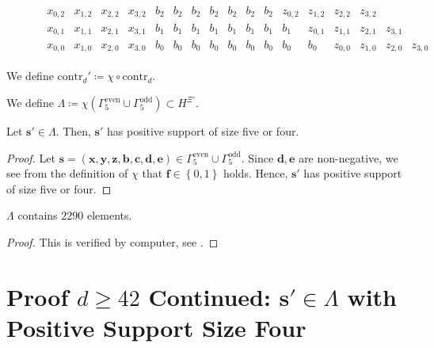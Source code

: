 \begin{definition}
\begin{figure}[H]
\begin{align*}
\begin{array}{cccccccccccccccccccc}
            x_{0,2} & x_{1,2} & x_{2,2} & x_{3,2} & b_2 & b_2 & b_2 & b_2 & b_2 & b_2 & b_2 & z_{0,2} & z_{1,2} & z_{2,2} & z_{3,2} \\
            x_{0,1} & x_{1,1} & x_{2,1} & x_{3,1} & b_1 & b_1 & b_1 & b_1 & b_1 & b_1 & b_1 & b_1 & z_{0,1} & z_{1,1} & z_{2,1} & z_{3,1} \\
            x_{0,0} & x_{1,0} & x_{2,0} & x_{3,0} & b_0 & b_0 & b_0 & b_0 & b_0 & b_0 & b_0 & b_0 & b_0 & z_{0,0} & z_{1,0} & z_{2,0} & z_{3,0}
        \end{array}
    \end{align*}  
\end{figure}

\end{definition}

\begin{definition}
    We define \( \mathrm{contr}_d' \coloneqq \chi \circ \mathrm{contr}_d \).
\end{definition}


\begin{definition}
    We define \( \Lambda  \coloneqq \chi( \Gamma^{\mathrm{even}}_5 \cup \Gamma^{\mathrm{odd}}_5 ) \subset H^{\Xi'} \).
\end{definition}


\begin{proposition}\label{prop:ieshwu4rhui3w}
    Let \( \mathbf{s}' \in \Lambda \). Then, \( \mathbf{s}' \) has positive support of size five or four.
\end{proposition}

\begin{proof}
    Let \( \mathbf{s} = (\mathbf{x}, \mathbf{y}, \mathbf{z}, \mathbf{b}, \mathbf{c}, \mathbf{d}, \mathbf{e}) \in  \Gamma^{\mathrm{even}}_5 \cup \Gamma^{\mathrm{odd}}_5 \). Since \( \mathbf{d}, \mathbf{e} \) are non-negative, we see from the definition of \( \chi \)
    that \( \mathbf{f} \in \left\{ 0,1 \right\} \) holds. Hence, \( \mathbf{s}' \) has positive support of size five or four.
\end{proof}
\begin{proposition}
    \( \Lambda \) contains \( 2290 \) elements.
\end{proposition}

\begin{proof}
    This is verified by computer, see \cite{ducrepo}.
\end{proof}

\section{Proof \( d \geq 42\) Continued: \( \mathbf{s}' \in \Lambda\) with Positive Support Size Four}

